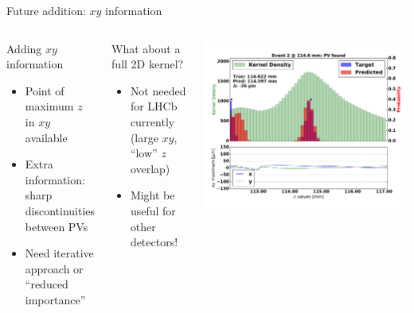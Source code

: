 \begin{frame}{Future addition: $x y$ information}


\begin{columns}[c]

  \begin{block}{Adding $x y$ information}
       \begin{itemize}
           \item Point of maximum $z$ in $x y$ available
           \item Extra information: sharp discontinuities between PVs
           \item Need iterative approach or ``reduced importance''
       \end{itemize}
  \end{block}

 \begin{block}{What about a full 2D kernel?}
      \begin{itemize}
          \item Not needed for LHCb currently (large $x y$, ``low'' $z$ overlap)
          \item Might be useful for other detectors!
      \end{itemize}
 \end{block}

 \begin{center}
     \includegraphics[width=1\textwidth, trim=60 0 60 0]{images/07Jan19_AltCNN4Layer_D35_sp_12.pdf}
 \end{center}
\end{columns}



\end{frame}

